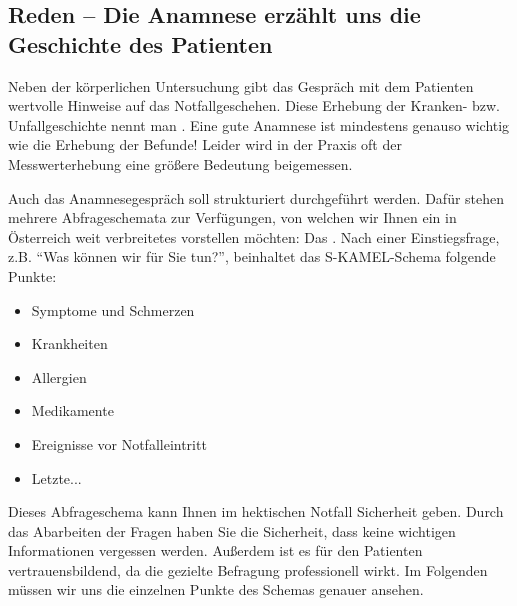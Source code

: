 \subsection{Reden -- Die Anamnese erz\"ahlt uns die
Geschichte des Patienten}

Neben der körperlichen Untersuchung gibt das Gespr\"ach mit dem Patienten wertvolle Hinweise auf das Notfallgeschehen. Diese Erhebung der Kranken- bzw. Unfallgeschichte nennt man . Eine gute Anamnese ist mindestens genauso wichtig wie die Erhebung der Befunde! Leider wird in der Praxis oft der Messwerterhebung eine größere Bedeutung beigemessen.

Auch das Anamnesegespräch soll strukturiert durchgeführt werden. Dafür stehen mehrere Abfrageschemata zur Verfügungen, von welchen wir Ihnen ein in Österreich weit verbreitetes vorstellen möchten: Das . Nach einer Einstiegsfrage, z.B. "`Was können wir für Sie tun?"', beinhaltet das S-KAMEL-Schema folgende Punkte:
\begin{itemize}
    \item Symptome und Schmerzen
    \item Krankheiten
    \item Allergien
    \item Medikamente
    \item Ereignisse vor Notfalleintritt
    \item Letzte...
\end{itemize}
Dieses Abfrageschema kann Ihnen im hektischen Notfall Sicherheit geben. Durch das Abarbeiten der Fragen haben Sie die Sicherheit, dass keine wichtigen Informationen vergessen werden. Außerdem ist es für den Patienten vertrauensbildend, da die gezielte Befragung professionell wirkt. Im Folgenden müssen wir uns die einzelnen Punkte des Schemas genauer ansehen.


